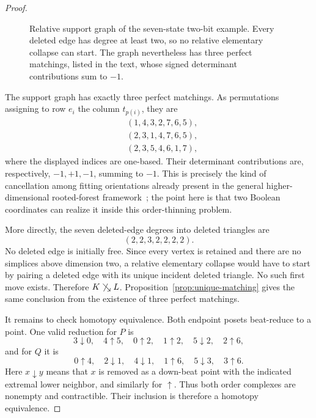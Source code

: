 \documentclass[11pt]{article}
\theoremstyle{definition}
\theoremstyle{remark}
\newcommand{\searrowrel}{\mathrel{\searrow}}
\begin{document}
\begin{proof}
\begin{figure}[t]
\centering
{}
\caption{Relative support graph of the seven-state two-bit example.  Every deleted
edge has degree at least two, so no relative elementary collapse can start.  The graph
nevertheless has three perfect matchings, listed in the text, whose signed determinant
contributions sum to $-1$.}
\label{fig:seven-support}
\end{figure}

The support graph has exactly three perfect matchings.  As permutations assigning to
row $e_i$ the column $t_{p(i)}$, they are
\[
\begin{split}
 &(1,4,3,2,7,6,5),\\
 &(2,3,1,4,7,6,5),\\
 &(2,3,5,4,6,1,7),
\end{split}
\]
where the displayed indices are one-based.  Their determinant contributions are,
respectively, $-1,+1,-1$, summing to $-1$.  This is precisely the kind of cancellation
among fitting orientations already present in the general higher-dimensional
rooted-forest framework~\cite{BernardiKlivans2016}; the point here is that two Boolean
coordinates can realize it inside this order-thinning problem.

More directly, the seven deleted-edge degrees into deleted triangles are
\[
  (2,2,3,2,2,2,2).
\]
No deleted edge is initially free.  Since every vertex is retained and there are no
simplices above dimension two, a relative elementary collapse would have to start by
pairing a deleted edge with its unique incident deleted triangle.  No such first move
exists.  Therefore $K\not\searrowrel L$.  Proposition~\ref{prop:unique-matching} gives
the same conclusion from the existence of three perfect matchings.

It remains to check homotopy equivalence.  Both endpoint posets beat-reduce to a point.
One valid reduction for $P$ is
\[
  3\downarrow0,\quad 4\uparrow5,\quad 0\uparrow2,\quad
  1\uparrow2,\quad 5\downarrow2,\quad 2\uparrow6,
\]
and for $Q$ it is
\[
  0\uparrow4,\quad 2\downarrow1,\quad 4\downarrow1,\quad
  1\uparrow6,\quad 5\downarrow3,\quad 3\uparrow6.
\]
Here $x\downarrow y$ means that $x$ is removed as a down-beat point with the indicated
extremal lower neighbor, and similarly for $\uparrow$.  Thus both order complexes are
nonempty and contractible.  Their inclusion is therefore a homotopy equivalence.
\end{proof}
\end{document}
